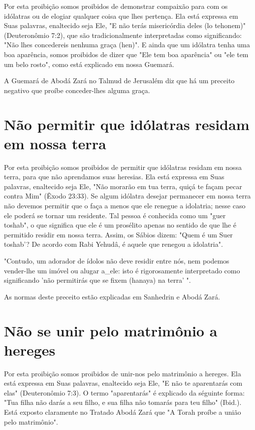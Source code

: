 \begin{itemize}
\begin{enumrate}
\begin{itemize}
\begin{itemize}
\begin{itemize}
Por esta proibição somos proibidos de demonstrar compaixão para com os
idólatras ou de elogiar qualquer coisa que lhes pertença. Ela está
ex­pressa em Suas palavras, enaltecido seja Ele, "E não terás
misericórdia deles (lo tehonem)" (Deuteronômio 7:2), que são
tradicionalmente interpretadas co­mo significando: "Não lhes concedereis
nenhuma graça (hen)". E ainda que um idólatra tenha uma boa aparência,
somos proibidos de dizer que "Ele tem boa aparência" ou "ele tem um belo
rosto", como está explicado em nossa Guemará.

A Guemará de Abodá Zará no Talmud de Jerusalém diz que há um preceito
negativo que proíbe conceder-lhes alguma graça.

\section{Não permitir que idólatras residam em nossa terra}

Por esta proibição somos proibidos de permitir que idólatras resi­dam em
nossa terra, para que não aprendamos suas heresias. Ela está expressa em
Suas palavras, enaltecido seja Ele, "Não morarão em tua terra, quiçá te
fa­çam pecar contra Mim" (Êxodo 23:33). Se algum idólatra desejar
permanecer em nossa terra não devemos permitir que o faça a menos que
ele renegue a idolatria; nesse caso ele poderá se tornar um residente.
Tal pessoa é conhecida como um "guer toshab", o que significa que ele é
um prosélito apenas no sen­tido de que lhe é permitido residir em nossa
terra. Assim, os Sábios dizem: "Quem é um Suer toshab'? De acordo com
Rabi Yehudâ, é aquele que rene­gou a idolatria".

"Contudo, um adorador de ídolos não deve residir entre nós, nem podemos
vender-lhe um imóvel ou alugar a\_ele: isto é rigorosamente
interpre­tado como significando 'não permitirás que se fixem (hanaya) na
terra' ".



As normas deste preceito estão explicadas em Sanhedrin e Abodá Zará.


\section{Não se unir pelo matrimônio a hereges}

Por esta proibição somos proibidos de unir-nos pelo matrimônio a
hereges. Ela está expressa em Suas palavras, enaltecido seja Ele, "E não
te apa­rentarás com elas" (Deuteronômio 7:3). O termo "aparentarás" é
explicado da séguinte forma: "Tua filha não darás a seu filho, e sua
filha não tomarás para teu filho" (Ibid.). Está exposto claramente no
Tratado Abodá Zará que "A To­rah proíbe a união pelo matrimônio".


\end{itemize}
\end{itemize}
\end{itemize}
\end{enumrate}
\end{itemize}
